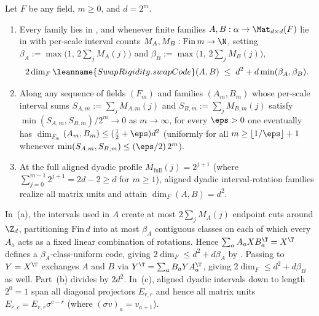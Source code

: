 \begin{proposition}\label{prop:multiscale-interval}
Let $F$ be any field, $m \ge 0$, and $d = 2^m$.
\begin{enumerate}[label=(\alph*)]
\item Every  family lies in ,
  and whenever finite families $A, B : \alpha \to \Mat_{d\times d}(F)$ lie in
   with per-scale interval counts $M_A, M_B : \mathrm{Fin}\,m \to \N$,
  setting $\beta_A := \max\bigl(1,\, 2\sum_j M_A(j)\bigr)$ and
  $\beta_B := \max\bigl(1,\, 2\sum_j M_B(j)\bigr)$,
  \[
    2\dim_F \leanname{SwapRigidity.swapCode}(A, B)
    \;\le\;
    d^2 + d\min(\beta_A, \beta_B).
  \]
\item Along any sequence of fields $(F_m)$ and families $(A_m, B_m)$ whose per-scale interval sums
  $S_{A,m} := \sum_j M_{A,m}(j)$ and $S_{B,m} := \sum_j M_{B,m}(j)$ satisfy
  $\min(S_{A,m}, S_{B,m}) / 2^m \to 0$ as $m \to \infty$, for every $\eps > 0$ one eventually has
  $\dim_{F_m}{}$$(A_m, B_m) \le (\frac{1}{2} + \eps)d^2$ (uniformly
  for all $m \ge \lfloor 1/\eps\rfloor + 1$ whenever $\min(S_{A,m}, S_{B,m}) \le (\eps/2)\,2^m$).
\item At the full aligned dyadic profile $M_{\mathrm{full}}(j) = 2^{j+1}$ (where
  $\sum_{j=0}^{m-1} 2^{j+1} = 2d - 2 \ge d$ for $m \ge 1$), aligned dyadic interval-rotation families
  realize all matrix units and attain $\dim_F {}$$(A, B) = d^2$.
\end{enumerate}
\end{proposition}
\begin{outline}
In~(a), the intervals used in $A$ create at most $2\sum_j M_A(j)$ endpoint cuts around $\Z_d$,
partitioning $\mathrm{Fin}\,d$ into at most $\beta_A$ contiguous classes on each of which every $A_a$
acts as a fixed linear combination of rotations. Hence $\sum_a A_a X B_a^{\T} = X^{\T}$ defines a
$\beta_A$-class-uniform code, giving $2\dim_F \le d^2 + d\beta_A$ by
\cite[Theorem~6.4]{SeventeenthPaper2026}. Passing to $Y = X^{\T}$ exchanges $A$ and $B$ via
$Y^{\T} = \sum_a B_a Y A_a^{\T}$, giving $2\dim_F \le d^2 + d\beta_B$ as well. Part~(b) divides by
$2d^2$. In~(c), aligned dyadic intervals down to length $2^0 = 1$ span all diagonal projectors
$E_{r,r}$ and hence all matrix units $E_{r,c} = E_{r,r}\sigma^{c-r}$ (where $(\sigma v)_a = v_{a+1}$).
\end{outline}

